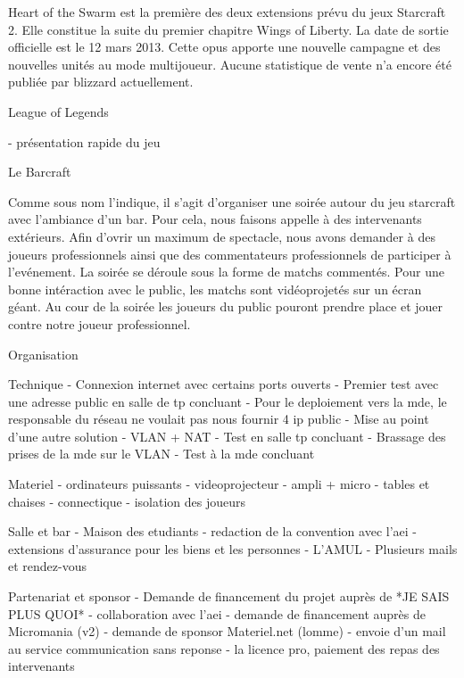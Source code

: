           Heart of the Swarm est la première des deux extensions prévu
          du jeux Starcraft 2. Elle constitue la suite du premier chapitre Wings
          of Liberty. La date de sortie officielle est le 12 mars 2013. Cette opus
          apporte une nouvelle campagne et des nouvelles unités au mode
          multijoueur. Aucune statistique de vente n'a encore été publiée par
          blizzard actuellement.

        League of Legends

          - présentation rapide du jeu

	Le Barcraft

     Comme sous nom l'indique, il s'agit d'organiser une soirée autour
     du jeu starcraft avec l'ambiance d'un bar.	Pour cela, nous faisons
     appelle à des intervenants extérieurs. Afin d'ovrir un maximum de
     spectacle, nous avons demander à des joueurs professionnels ainsi
     que des commentateurs professionnels de participer à l'evénement.
     La soirée se déroule sous la forme de matchs commentés. Pour une
     bonne intéraction avec le public, les matchs sont vidéoprojetés sur
     un écran géant. Au cour de la soirée les joueurs du public pouront
     prendre place et jouer contre notre joueur professionnel.

Organisation

	Technique
		- Connexion internet avec certains ports ouverts
		- Premier test avec une adresse public en salle de tp concluant
		- Pour le deploiement vers la mde, le responsable du réseau ne voulait pas nous fournir 4 ip public
		- Mise au point d'une autre solution
		       - VLAN + NAT
		- Test en salle tp concluant
 		- Brassage des prises de la mde sur le VLAN
		- Test à la mde concluant

	Materiel
		- ordinateurs puissants
		- videoprojecteur
		- ampli + micro
		- tables et chaises
		- connectique
    - isolation des joueurs

	Salle et bar
	      - Maison des etudiants
	      	       - redaction de la convention avec l'aei
		       - extensions d'assurance pour les biens et les personnes
	      - L'AMUL
			- Plusieurs mails et rendez-vous

	Partenariat et sponsor
        - Demande de financement du projet auprès de *JE SAIS PLUS QUOI*
		    - collaboration avec l'aei
        - demande de financement auprès de Micromania (v2)
		    - demande de sponsor Materiel.net (lomme)
		    - envoie d'un mail au service communication sans reponse
		    - la licence pro, paiement des repas des intervenants

